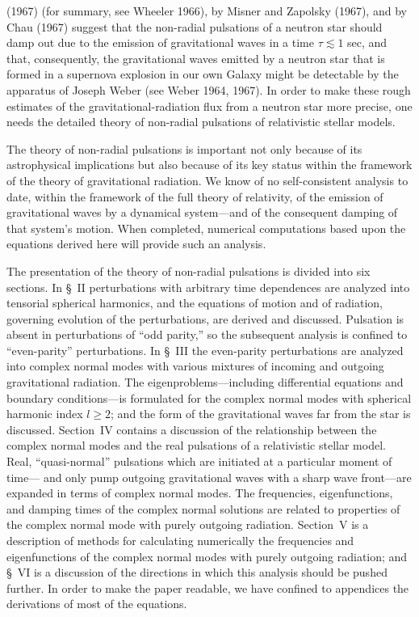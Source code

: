 (1967) (for summary, see Wheeler 1966), by Misner and Zapolsky (1967), and by Chau
(1967) suggest that the non-radial pulsations of a neutron star should damp out due
to the emission of gravitational waves in a time $\tau \lesssim 1$ sec, and that, consequently, the
gravitational waves emitted by a neutron star that is formed in a supernova explosion in
our own Galaxy might be detectable by the apparatus of Joseph Weber (see Weber
1964, 1967). In order to make these rough estimates of the gravitational-radiation flux
from a neutron star more precise, one needs the detailed theory of non-radial pulsations
of relativistic stellar models.

The theory of non-radial pulsations is important not only because of its astrophysical
implications but also because of its key status within the framework of the theory of
gravitational radiation. We know of no self-consistent analysis to date, within the
framework of the full theory of relativity, of the emission of gravitational waves by a
dynamical system---and of the consequent damping of that system's motion. When completed,
numerical computations based upon the equations derived here will provide
such an analysis.

The presentation of the theory of non-radial pulsations is divided into six sections.
In \S~II perturbations with arbitrary time dependences are analyzed into tensorial
spherical harmonics, and the equations of motion and of radiation, governing evolution of
the perturbations, are derived and discussed. Pulsation is absent in perturbations of
``odd parity,'' so the subsequent analysis is confined to ``even-parity'' perturbations. In
\S~III the even-parity perturbations are analyzed into complex normal modes with various
mixtures of incoming and outgoing gravitational radiation. The eigenproblems---including
differential equations and boundary conditions---is formulated for the complex
normal modes with spherical harmonic index $l \geq 2$; and the form of the gravitational
waves far from the star is discussed. Section~IV contains a discussion of the relationship
between the complex normal modes and the real pulsations of a relativistic stellar model.
Real, ``quasi-normal'' pulsations which are initiated at a particular moment of time---
and only pump outgoing gravitational waves with a sharp wave front---are expanded in
terms of complex normal modes. The frequencies, eigenfunctions, and damping times of
the complex normal solutions are related to properties of the complex normal mode with
purely outgoing radiation. Section~V is a description of methods for calculating numerically
the frequencies and eigenfunctions of the complex normal modes with purely
outgoing radiation; and \S~VI is a discussion of the directions in which this analysis
should be pushed further. In order to make the paper readable, we have confined to
appendices the derivations of most of the equations.

